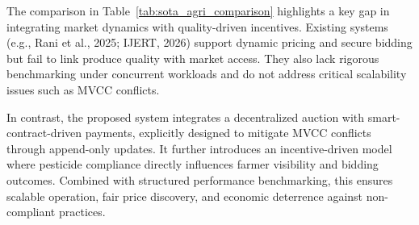 \documentclass[12pt]{article}
\begin{document}
	
	
	The comparison in Table~\ref{tab:sota_agri_comparison} highlights a key gap in integrating market dynamics with quality-driven incentives. Existing systems (e.g., Rani et al., 2025; IJERT, 2026) support dynamic pricing and secure bidding but fail to link produce quality with market access. They also lack rigorous benchmarking under concurrent workloads and do not address critical scalability issues such as MVCC conflicts.
	
	In contrast, the proposed system integrates a decentralized auction with smart-contract-driven payments, explicitly designed to mitigate MVCC conflicts through append-only updates. It further introduces an incentive-driven model where pesticide compliance directly influences farmer visibility and bidding outcomes. Combined with structured performance benchmarking, this ensures scalable operation, fair price discovery, and economic deterrence against non-compliant practices.
	
	
	
	
	
\end{document}
